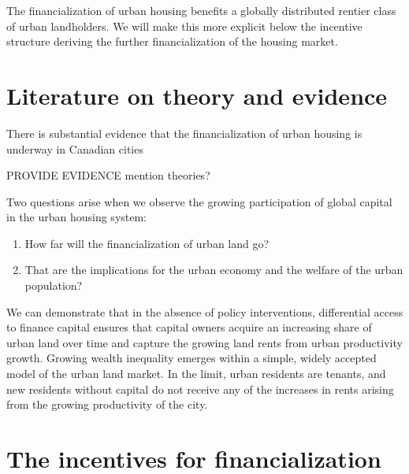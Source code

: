 The financialization of urban housing benefits  a globally distributed rentier class of urban landholders. We will make this more explicit below the incentive structure deriving the further financialization of the housing market.

\section{Literature on theory and evidence}
{\color{red}There is substantial evidence that the financialization of urban housing is underway in Canadian cities

PROVIDE EVIDENCE 	mention theories?}

Two questions arise when we observe the growing participation of global capital in the urban housing system: 
\begin{enumerate}
\item How far will the financialization of urban land go? 
\item That are the implications for the urban economy and the welfare of the urban population? 
\end{enumerate}

We can demonstrate  that  in the absence of policy interventions, differential access to finance capital ensures that capital owners acquire an increasing share of urban land over time and capture the growing  land rents  from urban productivity growth. Growing wealth inequality emerges within a simple, widely accepted model of the urban land market. In the limit,  urban residents are tenants, and new residents  without capital do  not receive any of the increases in rents arising from the growing productivity of the city. 



\section{The incentives for financialization}%



